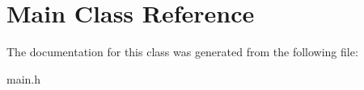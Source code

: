 \hypertarget{classMain}{}\section{Main Class Reference}
\label{classMain}


The documentation for this class was generated from the following file\+:\begin{DoxyCompactItemize}
\item 
main.\+h\end{DoxyCompactItemize}
